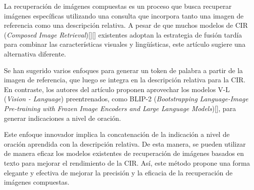 La recuperación de imágenes compuestas es un proceso que busca recuperar imágenes específicas utilizando una consulta que incorpora tanto una imagen de referencia como una descripción relativa. A pesar de que muchos modelos de CIR (\textit{Composed Image Retrieval})[\cite{CBIR-DeepLearning}][\cite{embedding2}] existentes adoptan la estrategia de fusión tardía para combinar las características visuales y lingüísticas, este artículo sugiere una alternativa diferente.

Se han sugerido varios enfoques para generar un token de palabra a partir de la imagen de referencia, que luego se integra en la descripción relativa para la CIR. En contraste, los autores del artículo proponen aprovechar los modelos V-L (\textit{Vision - Language}) preentrenados, como BLIP-2 (\textit{Bootstrapping Language-Image Pre-training with Frozen Image Encoders and Large Language Models})[\cite{blip-2}], para generar indicaciones a nivel de oración.

Este enfoque innovador implica la concatenación de la indicación a nivel de oración aprendida con la descripción relativa. De esta manera, se pueden utilizar de manera eficaz los modelos existentes de recuperación de imágenes basados en texto para mejorar el rendimiento de la CIR. Así, este método propone una forma elegante y efectiva de mejorar la precisión y la eficacia de la recuperación de imágenes compuestas.